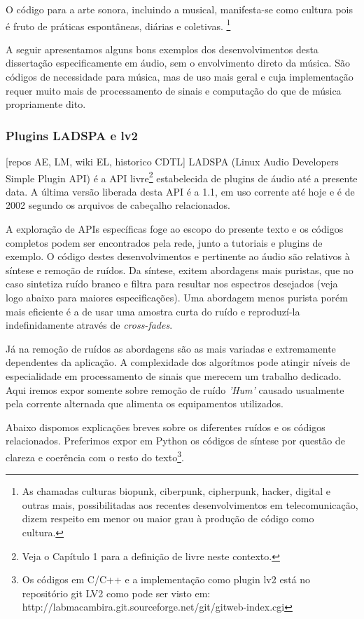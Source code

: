 O código para a arte sonora, incluindo a musical, manifesta-se como cultura pois é fruto de práticas
espontâneas, diárias e coletivas.
\footnote{As chamadas culturas biopunk, ciberpunk, cipherpunk, hacker, digital e outras mais,
possibilitadas aos recentes desenvolvimentos em telecomunicação, dizem respeito em menor
ou maior grau à produção de código como cultura.}

A seguir apresentamos alguns bons exemplos dos desenvolvimentos
desta dissertação especificamente em áudio, sem o envolvimento direto da música. São
códigos de necessidade para música, mas de uso mais geral e cuja implementação
requer muito mais de processamento de sinais e computação do que de música propriamente dito.

      \subsubsection{Plugins LADSPA e lv2}
      [repos AE, LM, wiki EL, historico CDTL]
LADSPA (Linux Audio Developers Simple Plugin API) é a API livre\footnote{Veja o Capítulo 1 para a definição de livre neste contexto.} estabelecida de plugins de áudio até a presente data. A última versão liberada desta API é a 1.1, em uso corrente até hoje e é de 2002 segundo os arquivos de cabeçalho relacionados.

A exploração de APIs específicas foge ao escopo do presente texto e os códigos completos podem ser encontrados pela rede, junto a tutoriais e plugins de exemplo. O código destes desenvolvimentos e pertinente ao áudio são relativos à síntese e remoção de ruídos. Da síntese, exitem abordagens mais puristas, que no caso sintetiza ruído branco e filtra para resultar nos espectros desejados (veja logo abaixo para maiores especificações). Uma abordagem menos purista porém mais eficiente é a de usar uma amostra curta do ruído e reproduzí-la indefinidamente através de \emph{cross-fades}.

Já na remoção de ruídos as abordagens são as mais variadas e extremamente dependentes da aplicação. A complexidade dos algorítmos pode atingir níveis de especialidade em processamento de sinais que merecem um trabalho dedicado. Aqui iremos expor somente sobre remoção de ruído \emph{'Hum'} causado usualmente pela corrente alternada que alimenta os equipamentos utilizados.

Abaixo dispomos explicações breves sobre os diferentes ruídos e os códigos relacionados. Preferimos expor em Python os códigos de síntese
por questão de clareza e coerência com o resto do texto\footnote{Os códigos em C/C++ e a implementação como plugin lv2 está no repositório git LV2 como pode ser visto em: http://labmacambira.git.sourceforge.net/git/gitweb-index.cgi}.

